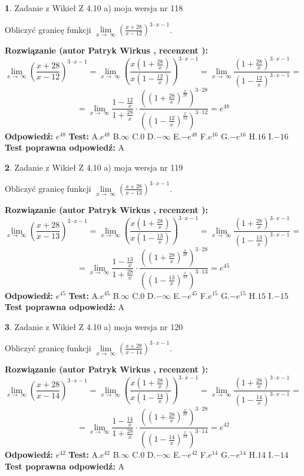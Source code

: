 \documentclass[12pt, a4paper]{article}
\theoremstyle{definition} %
\newtheorem{zad}{}
\newcommand{\zadStart}[1]{\begin{zad}#1\newline}
\newcommand{\zadStop}{\end{zad}}
\newcommand{\rozwStart}[2]{\noindent \textbf{Rozwiązanie (autor #1 , recenzent #2): }\newline}
\newcommand{\rozwStop}{\newline}
\newcommand{\odpStart}{\noindent \textbf{Odpowiedź:}\newline}
\newcommand{\odpStop}{\newline}
\newcommand{\testStart}{\noindent \textbf{Test:}\newline}
\newcommand{\testStop}{\newline}
\newcommand{\kluczStart}{\noindent \textbf{Test poprawna odpowiedź:}\newline}
\newcommand{\kluczStop}{\newline}
\begin{document}
\zadStart{Zadanie z Wikieł Z 4.10 a) moja wersja nr 118}

Obliczyć granicę funkcji  $\lim\limits_{x\to\ \infty}(\frac{x+28}{x-12})^{3\cdot x-1}$.
\zadStop
\rozwStart{Patryk Wirkus}{}
$$\lim\limits_{x\to\ \infty}(\frac{x+28}{x-12})^{3\cdot x-1} = \lim\limits_{x\to\ \infty}(\frac{x(1+\frac{28}{x})}{x(1-\frac{12}{x})})^{3\cdot x-1}=\lim\limits_{x\to\ \infty}\frac{(1+\frac{28}{x})^{3\cdot x-1}}{(1-\frac{12}{x})^{3\cdot x-1}}=$$
$$=\lim\limits_{x\to\ \infty}\frac{1-\frac{12}{x}}{1+\frac{28}{x}}\cdot\frac{((1+\frac{28}{x})^{\frac{x}{28}})^{3\cdot28}}{((1-\frac{12}{x})^{\frac{x}{12}})^{3\cdot12}}=e^{48}$$
\rozwStop
\odpStart
$e^{48}$
\odpStop
\testStart
A.$e^{48}$ B.$\infty$ C.$0$ D.$-\infty$ E.$-e^{48}$
F.$e^{16}$ G.$-e^{16}$
H.$16$
I.$-16$
\testStop
\kluczStart
A
\kluczStop



\zadStart{Zadanie z Wikieł Z 4.10 a) moja wersja nr 119}

Obliczyć granicę funkcji  $\lim\limits_{x\to\ \infty}(\frac{x+28}{x-13})^{3\cdot x-1}$.
\zadStop
\rozwStart{Patryk Wirkus}{}
$$\lim\limits_{x\to\ \infty}(\frac{x+28}{x-13})^{3\cdot x-1} = \lim\limits_{x\to\ \infty}(\frac{x(1+\frac{28}{x})}{x(1-\frac{13}{x})})^{3\cdot x-1}=\lim\limits_{x\to\ \infty}\frac{(1+\frac{28}{x})^{3\cdot x-1}}{(1-\frac{13}{x})^{3\cdot x-1}}=$$
$$=\lim\limits_{x\to\ \infty}\frac{1-\frac{13}{x}}{1+\frac{28}{x}}\cdot\frac{((1+\frac{28}{x})^{\frac{x}{28}})^{3\cdot28}}{((1-\frac{13}{x})^{\frac{x}{13}})^{3\cdot13}}=e^{45}$$
\rozwStop
\odpStart
$e^{45}$
\odpStop
\testStart
A.$e^{45}$ B.$\infty$ C.$0$ D.$-\infty$ E.$-e^{45}$
F.$e^{15}$ G.$-e^{15}$
H.$15$
I.$-15$
\testStop
\kluczStart
A
\kluczStop



\zadStart{Zadanie z Wikieł Z 4.10 a) moja wersja nr 120}

Obliczyć granicę funkcji  $\lim\limits_{x\to\ \infty}(\frac{x+28}{x-14})^{3\cdot x-1}$.
\zadStop
\rozwStart{Patryk Wirkus}{}
$$\lim\limits_{x\to\ \infty}(\frac{x+28}{x-14})^{3\cdot x-1} = \lim\limits_{x\to\ \infty}(\frac{x(1+\frac{28}{x})}{x(1-\frac{14}{x})})^{3\cdot x-1}=\lim\limits_{x\to\ \infty}\frac{(1+\frac{28}{x})^{3\cdot x-1}}{(1-\frac{14}{x})^{3\cdot x-1}}=$$
$$=\lim\limits_{x\to\ \infty}\frac{1-\frac{14}{x}}{1+\frac{28}{x}}\cdot\frac{((1+\frac{28}{x})^{\frac{x}{28}})^{3\cdot28}}{((1-\frac{14}{x})^{\frac{x}{14}})^{3\cdot14}}=e^{42}$$
\rozwStop
\odpStart
$e^{42}$
\odpStop
\testStart
A.$e^{42}$ B.$\infty$ C.$0$ D.$-\infty$ E.$-e^{42}$
F.$e^{14}$ G.$-e^{14}$
H.$14$
I.$-14$
\testStop
\kluczStart
A
\kluczStop
\end{document}
